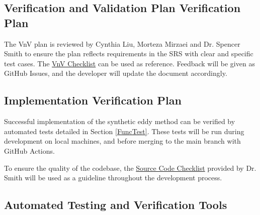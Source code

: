 \documentclass[12pt, titlepage]{article}
\begin{document}

\subsection{Verification and Validation Plan Verification Plan}

The VnV plan is reviewed by Cynthia Liu, Morteza Mirzaei and Dr. Spencer Smith to ensure the plan reflects requirements in the SRS with clear and specific test cases. The \href{https://github.com/omltcat/turbulent-flow/blob/main/docs/Checklists/VnV-Checklist.pdf}{VnV Checklist} can be used as reference. Feedback will be given as GitHub Issues, and the developer will update the document accordingly.
 




\subsection{Implementation Verification Plan}

Successful implementation of the synthetic eddy method can be verified by automated tests detailed in Section \ref{FuncTest}. These tests will be run during development on local machines, and before merging to the main branch with GitHub Actions.

To ensure the quality of the codebase, the \href{https://github.com/omltcat/turbulent-flow/blob/main/docs/Checklists/Code-Checklist.pdf}{Source Code Checklist} provided by Dr. Smith will be used as a guideline throughout the development process. 



\subsection{Automated Testing and Verification Tools}
\end{document}

